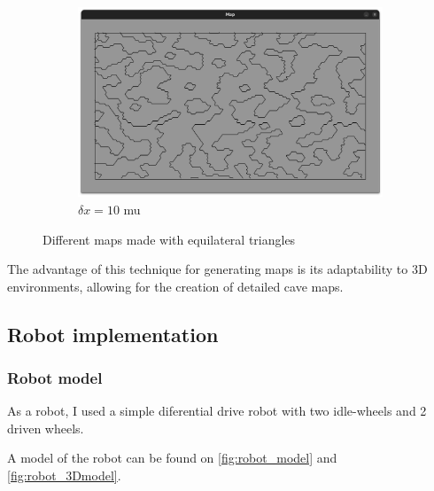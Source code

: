 \documentclass[../main.tex]{subfiles}
\begin{document}
\begin{figure}[H]
\begin{subfigure}{0.3\textwidth}
        \includegraphics[width=\textwidth]{IMAGES/part5/map_dx10.png}
        \caption{$\delta x = 10$ mu}
		\label{fig:real_map_10}
    \end{subfigure}
    \caption{Different maps made with equilateral triangles}
    \label{fig:three_map_example}
\end{figure}

The advantage of this technique for generating maps is its adaptability to 3D environments, allowing for the creation of detailed cave maps.

\subsection{Robot implementation}

\subsubsection{Robot model}
\label{sec:robot_model}

As a robot, I used a simple diferential drive robot with two idle-wheels and 2 driven wheels.

\vspace{0.5em}

A model of the robot can be found on \autoref{fig:robot_model} and \autoref{fig:robot_3Dmodel}.
\end{document}

